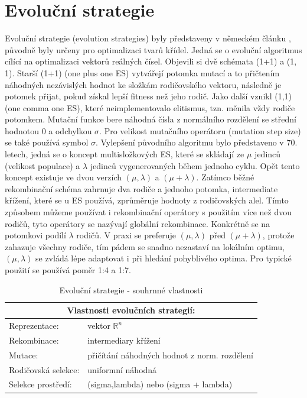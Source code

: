 \section{Evoluční strategie}
\label{sec:ES}
Evoluční strategie (evolution strategies) byly představeny v německém článku \cite{rechenberg1978evolutionsstrategien}, původně byly určeny pro optimalizaci tvarů křídel. Jedná se o evoluční algoritmus cílící na optimalizaci vektorů reálných čísel. Objevili si dvě schémata (1+1) a (1, 1). Starší (1+1) (one plus one ES) vytvářejí potomka mutací a to přičtením náhodných nezávislých hodnot ke složkám rodičovského vektoru, následně je potomek přijat, pokud získal lepší fitness než jeho rodič. Jako další vznikl (1,1) (one comma one ES), které neimplementovalo elitismus, tzn. měnila vždy rodiče potomkem. Mutační funkce bere náhodná čísla z normálního rozdělení se střední hodnotou 0 a odchylkou $\sigma$. Pro velikost mutačního operátoru (mutation step size) se také používá symbol $\sigma$. Vylepšení původního algoritmu bylo představeno v 70. letech, jedná se o koncept multisložkových ES, které se skládají ze $\mu$ jedinců (velikost populace) a $\lambda$ jedinců vygenerovaných během jednoho cyklu. Opět tento koncept existuje ve dvou verzích $(\mu,\lambda)$ a $(\mu + \lambda)$. Zatímco běžné rekombinační schéma zahrnuje dva rodiče a jednoho potomka, intermediate křížení, které se u ES používá, zprůměruje hodnoty z rodičovských alel. Tímto způsobem můžeme používat i rekombinační operátory s použitím více než dvou rodičů, tyto operátory se nazývají globální rekombinace. Konkrétně se na potomkovi podílí $\lambda$ rodičů. V praxi se preferuje $(\mu,\lambda)$ před $(\mu + \lambda)$, protože zahazuje všechny rodiče, tím pádem se snadno nezastaví na lokálním optimu, $(\mu,\lambda)$ se zvládá lépe adaptovat i při hledání pohyblivého optima. Pro typické použití se používá poměr 1:4 a 1:7. \clearpage
\begin{table}[h]\centering
  \begin{tabular}{ l l }
      \multicolumn{2}{c}{Vlastnosti evolučních strategií:} \\
      \hline \hline
      Reprezentace: & vektor $\mathbb{R}^n$ \\
      \hline  
      Rekombinace: & intermediary křížení \\
      \hline  
      Mutace: & přičítání náhodných hodnot z norm. rozdělení \\
      \hline   
      Rodičovská selekce: & uniformní náhodná \\
      \hline   
      Selekce prostředí: & (sigma,lambda) nebo (sigma + lambda) \\
    \end{tabular} 
\caption{Evoluční strategie - souhrnné vlastnosti}
  \end{table} 

